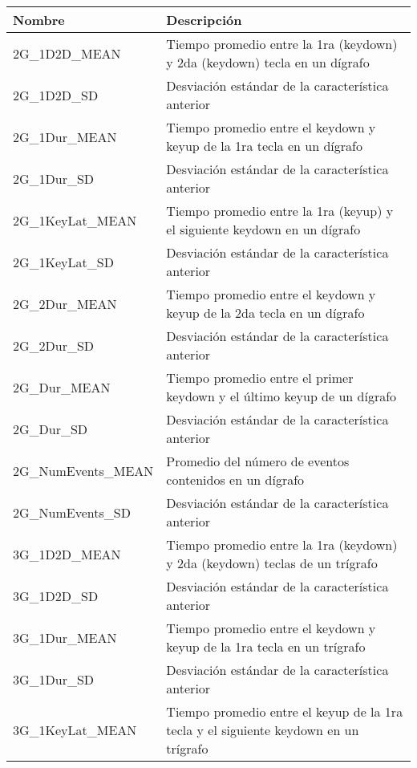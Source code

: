 \begin{center}
  \label{features}
  \begin{table}
  \scriptsize
  \begin{tabular}{| p{4cm} | p{10cm} |}
    \hline
    Nombre & Descripción \\ \hline
    2G\_1D2D\_MEAN & Tiempo promedio entre la 1ra (keydown) y 2da (keydown) tecla en un dígrafo\\ \hline
    2G\_1D2D\_SD & Desviación estándar de la característica anterior \\ \hline
    2G\_1Dur\_MEAN & Tiempo promedio entre el keydown y keyup de la 1ra
    tecla en un dígrafo \\ \hline
    2G\_1Dur\_SD & Desviación estándar de la característica anterior \\ \hline
    2G\_1KeyLat\_MEAN &  Tiempo promedio entre la 1ra (keyup) y el
    siguiente keydown en un dígrafo \\ \hline
    2G\_1KeyLat\_SD & Desviación estándar de la característica anterior \\ \hline
    2G\_2Dur\_MEAN & Tiempo promedio entre el keydown y keyup de la 2da
    tecla en un dígrafo \\ \hline
    2G\_2Dur\_SD & Desviación estándar de la característica anterior \\ \hline
    2G\_Dur\_MEAN & Tiempo promedio entre el primer keydown y el último
    keyup de un dígrafo \\ \hline
    2G\_Dur\_SD & Desviación estándar de la característica anterior \\ \hline
    2G\_NumEvents\_MEAN & Promedio del número de eventos contenidos en
    un dígrafo \\ \hline
    2G\_NumEvents\_SD & Desviación estándar de la característica anterior \\ \hline
    3G\_1D2D\_MEAN & Tiempo promedio entre la 1ra (keydown) y 2da
    (keydown) teclas de un trígrafo \\ \hline
    3G\_1D2D\_SD & Desviación estándar de la característica anterior \\ \hline
    3G\_1Dur\_MEAN & Tiempo promedio entre el keydown y keyup de la 1ra
    tecla en un trígrafo \\ \hline
    3G\_1Dur\_SD & Desviación estándar de la característica anterior \\ \hline
    3G\_1KeyLat\_MEAN & Tiempo promedio entre el keyup de la 1ra tecla y
    el siguiente keydown en un trígrafo\\ \hline

\end{tabular}
\end{table}
\end{center}
